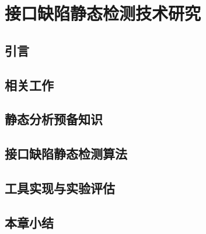 \chapter{接口缺陷静态检测技术研究}
\label{cha:imchecker}

\section{引言}
\section{相关工作}
\section{静态分析预备知识}
\section{接口缺陷静态检测算法}
\section{工具实现与实验评估}
\section{本章小结}
